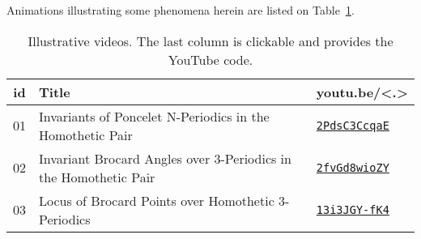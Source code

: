 Animations illustrating some phenomena herein are listed on Table~\ref{tab:playlist}.

\begin{table}[H]
\small
\begin{tabular}{|c|l|l|}
\hline
id & Title & \textbf{youtu.be/<.>}\\
\hline
01 & {Invariants of Poncelet N-Periodics in the Homothetic Pair} &
\href{https://youtu.be/2PdsC3CcqaE}{\texttt{2PdsC3CcqaE}}\\
02 & {Invariant Brocard Angles over 3-Periodics in the Homothetic Pair} & \href{https://youtu.be/2fvGd8wioZY}{\texttt{2fvGd8wioZY}} \\
03 & {Locus of Brocard Points over Homothetic 3-Periodics} & \href{https://youtu.be/13i3JGY-fK4}{\texttt{13i3JGY-fK4}}\\
\hline
\end{tabular}
\caption{Illustrative videos. The last column is clickable and provides the YouTube code.}
\label{tab:playlist}
\end{table}